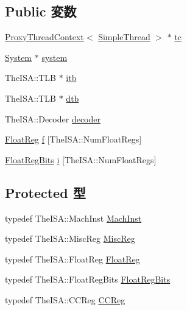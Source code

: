 \subsection*{Public 変数}
\begin{DoxyCompactItemize}
\item 
\hyperlink{classProxyThreadContext}{ProxyThreadContext}$<$ \hyperlink{classSimpleThread}{SimpleThread} $>$ $\ast$ \hyperlink{classSimpleThread_a922168dc0855a866d2ed033338c1ca27}{tc}
\item 
\hyperlink{classSystem}{System} $\ast$ \hyperlink{classSimpleThread_af27ccd765f13a4b7bd119dc7579e2746}{system}
\item 
TheISA::TLB $\ast$ \hyperlink{classSimpleThread_abcb37ddc11515555d8484702697bc4bb}{itb}
\item 
TheISA::TLB $\ast$ \hyperlink{classSimpleThread_ad2fd039621f87592c4b344d4f8948e78}{dtb}
\item 
TheISA::Decoder \hyperlink{classSimpleThread_a8adfd3ea89691b05b671dd288a595958}{decoder}
\item 
\hyperlink{classSimpleThread_a75484259f1855aabc8d74c6eb1cfe186}{FloatReg} \hyperlink{classSimpleThread_a1ad2ddcae8ed0b6b5f1807294a6093e7}{f} \mbox{[}TheISA::NumFloatRegs\mbox{]}
\item 
\hyperlink{classSimpleThread_aab5eeae86499f9bfe15ef79360eccc64}{FloatRegBits} \hyperlink{classSimpleThread_a2dbb1d94eafced2e977e763f9254a549}{i} \mbox{[}TheISA::NumFloatRegs\mbox{]}
\end{DoxyCompactItemize}
\subsection*{Protected 型}
\begin{DoxyCompactItemize}
\item 
typedef TheISA::MachInst \hyperlink{classSimpleThread_a4617f528417b8f55f809ae0988284c9b}{MachInst}
\item 
typedef TheISA::MiscReg \hyperlink{classSimpleThread_aaf5f073a387db0556d1db4bcc45428bc}{MiscReg}
\item 
typedef TheISA::FloatReg \hyperlink{classSimpleThread_a75484259f1855aabc8d74c6eb1cfe186}{FloatReg}
\item 
typedef TheISA::FloatRegBits \hyperlink{classSimpleThread_aab5eeae86499f9bfe15ef79360eccc64}{FloatRegBits}
\item 
typedef TheISA::CCReg \hyperlink{classSimpleThread_a0c9de550a32808e6a25b54b6c791d5ab}{CCReg}
\end{DoxyCompactItemize}
